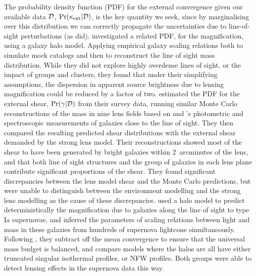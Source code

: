 \documentclass[useAMS,usenatbib]{mn2e}
\begin{document}
The probability density function (PDF) for the external convergence
given our available data ${\mathcal{D}}$, $\Pr(\kappa_{\rm ext}|{\mathcal{D}})$,  is the  key
quantity we seek, since by marginalising over this distribution we can
correctly propagate the uncertainties due to line-of-sight perturbations
(as \citeauthor{FadelyEtal2009} did).  
%
\citet{GunnarssonEtal2006} investigated a related PDF,  for the
magnification, using a galaxy halo model. Applying empirical galaxy
scaling relations both to simulate mock catalogs and then to reconstruct
the line of sight mass distribution. While they did not explore highly
overdense lines of sight, or the impact of groups and clusters, they
found that under their simplifying assumptions, the dispersion in
apparent source brightness due to lensing magnification could be reduced
by a factor of two.
%
\citet{WongEtal2011} estimated the PDF for the external shear,
$\Pr(\gamma|{\mathcal{D}})$ from their survey data, running similar Monte Carlo
reconstructions of the mass in nine lens fields based on
\citeauthor{WilliamsEtal2006} and \citeauthor{MomchevaEtal2006}'s
photometric and spectroscopic measurements of galaxies close to the line
of sight. They then  compared the resulting predicted shear
distributions with the external shear demanded by the strong lens model.
Their reconstructions showed most of the shear to have been generated by
bright galaxies within 2~arcminutes of the lens, and that both line of
sight structures and the group of galaxies in each lens plane contribute
significant proportions of the shear. They found significant
discrepancies between the lens model shear and the Monte Carlo
predictions, but were unable to distinguish between the environment
modelling and the strong lens modelling as the cause of these
discrepancies.
%
\citet{KarpenkaEtal2012} used a halo model to predict deterministically 
the magnification due to
galaxies along the line of sight to type Ia supernovae, and inferred the
parameters of scaling relations between light and mass in these galaxies
from hundreds of supernova lightcone simultaneously. Following
\citet{JonssonEtal2010}, they subtract off the mean convergence to ensure that
the universal mass budget is balanced, and compare models where the halos are
all have either truncated singular isothermal profiles, or 
NFW profiles. Both groups were able to 
detect lensing effects in the supernova data this way.
\end{document}
